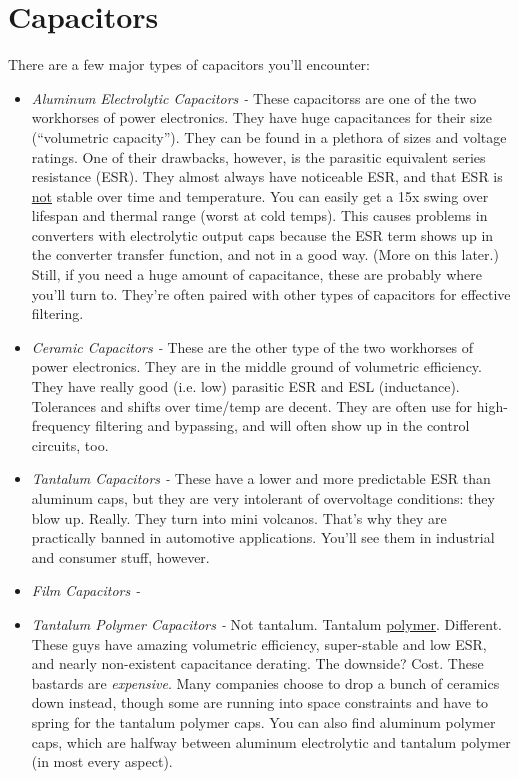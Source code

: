 \section{Capacitors}

There are a few major types of capacitors you'll encounter:

\begin{itemize}
\item \emph{Aluminum Electrolytic Capacitors -} These capacitorss are one of the two workhorses of power electronics. They have huge capacitances for their size (``volumetric capacity''). They can be found in a plethora of sizes and voltage ratings. One of their drawbacks, however, is the parasitic equivalent series resistance (ESR). They almost always have noticeable ESR, and that ESR is \underline{not} stable over time and temperature. You can easily get a 15x swing over lifespan and thermal range (worst at cold temps). This causes problems in converters with electrolytic output caps because the ESR term shows up in the converter transfer function, and not in a good way. (More on this later.) Still, if you need a huge amount of capacitance, these are probably where you'll turn to. They're often paired with other types of capacitors for effective filtering.
\item \emph{Ceramic Capacitors -} These are the other type of the two workhorses of power electronics. They are in the middle ground of volumetric efficiency. They have really good (i.e. low) parasitic ESR and ESL (inductance). Tolerances and shifts over time/temp are decent. They are often use for high-frequency filtering and bypassing, and will often show up in the control circuits, too.
\item \emph{Tantalum Capacitors -} These have a lower and more predictable ESR than aluminum caps, but they are very intolerant of overvoltage conditions: they blow up. Really. They turn into mini volcanos. That's why they are practically banned in automotive applications. You'll see them in industrial and consumer stuff, however.
\item \emph{Film Capacitors -} %
\item \emph{Tantalum Polymer Capacitors -} Not tantalum. Tantalum \underline{polymer}. Different. These guys have amazing volumetric efficiency, super-stable and low ESR, and nearly non-existent capacitance derating. The downside? Cost. These bastards are \emph{expensive}. Many companies choose to drop a bunch of ceramics down instead, though some are running into space constraints and have to spring for the tantalum polymer caps. You can also find aluminum polymer caps, which are halfway between aluminum electrolytic and tantalum polymer (in most every aspect).

\end{itemize}
